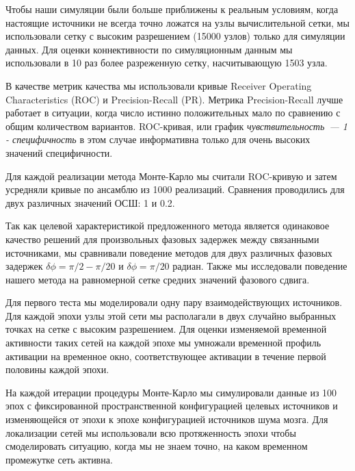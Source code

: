 Чтобы наши симуляции были больше приближены к реальным условиям, когда настоящие источники
не всегда точно ложатся на узлы вычислительной сетки, мы использовали сетку с высоким
разрешением (15000 узлов) только для симуляции данных. Для оценки
коннективности по симуляционным данным мы использовали в 10 раз более разреженную сетку,
насчитывающую 1503 узла.

В качестве метрик качества мы использовали кривые Receiver Operating Characteristics (ROC)
и Precision-Recall (PR). Метрика Precision-Recall лучше работает в ситуации, когда
число истинно положительных мало по сравнению с общим количеством вариантов.
ROC-кривая, или график \emph{чувствительность~--- 1 - специфичность} в этом случае информативна
только для очень высоких значений специфичности.

Для каждой реализации метода Монте-Карло мы считали ROC-кривую и затем
усредняли кривые по ансамблю из 1000 реализаций. Сравнения проводились для двух различных
значений ОСШ: 1 и 0.2. 

Так как целевой характеристикой предложенного метода является одинаковое качество
решений для произвольных фазовых задержек между связанными источниками, мы сравнивали
поведение методов для двух различных фазовых задержек $\delta\phi=\pi/2-\pi/20$ и
$\delta\phi=\pi/20$ радиан. Также мы исследовали поведение нашего метода на
равномерной сетке средних значений фазового сдвига.

Для первого теста мы моделировали одну пару взаимодействующих источников. Для каждой эпохи
узлы этой сети мы располагали в двух случайно выбранных точках на сетке с высоким разрешением.
Для оценки изменяемой временной активности таких сетей на каждой эпохе мы умножали временной
профиль активации на временное окно, соответствующее активации в течение первой половины
каждой эпохи. %

На каждой итерации процедуры Монте-Карло мы симулировали данные из 100 эпох с фиксированной
пространственной конфигурацией целевых источников и изменяющейся от эпохи к эпохе конфигурацией
источников шума мозга. Для локализации сетей мы использовали всю протяженность эпохи
чтобы смоделировать ситуацию, когда мы не знаем точно, на каком временном промежутке
сеть активна.

